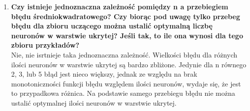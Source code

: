 \begin{enumerate}
\item \textbf{
Czy istnieje jednoznaczna zależność pomiędzy n a przebiegiem błędu średniokwadratowego? Czy biorąc pod uwagę tylko przebeg błędu dla zbioru uczącego można ustalić optymalną liczbę neuronów w warstwie ukrytej? Jeśli tak, to ile ona wynosi dla tego zbioru przykładów?}
\\Nie, nie isrtnieje taka jednoznaczna zależność. Wielkości błędu dla różnych ilości neuronów w warstwie ukrytej są bardzo zbliżone. Jedynie dla n równego 2, 3, lub 5 błąd jest nieco większy, jednak ze względu na brak monotoniczności funkcji błędu względem ilości neuronów, wydaje się, że jest to przypadkowa różnica. Na podstawie samego przebiegu błędu nie można ustalić optymalnej ilości neuronów w warstwie ukrytej.
\end{enumerate}


